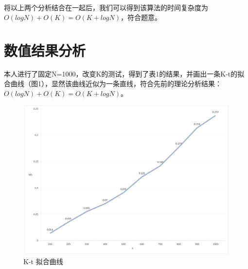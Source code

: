 \documentclass[UTF8]{ctexart}
\begin{document}
将以上两个分析结合在一起后，我们可以得到该算法的时间复杂度为$O(logN)+O(K)=O(K+logN)$，符合题意。

\section{数值结果分析}

本人进行了固定N=1000，改变K的测试，得到了表1的结果，并画出一条K-t的拟合曲线（图1），显然该曲线近似为一条直线，符合先前的理论分析结果：$O(logN)+O(K)=O(K+logN)$。

\begin{table}[!htbp] 
    \caption{测试结果}
\end{table}

\begin{figure}[htbp]
  \centering
    \begin{minipage}[b]{.9\linewidth}
      \centering
      \includegraphics[scale=0.53]{graph.jpg}
    \end{minipage}
    
\caption{K-t 拟合曲线}
\end{figure}
\end{document}
